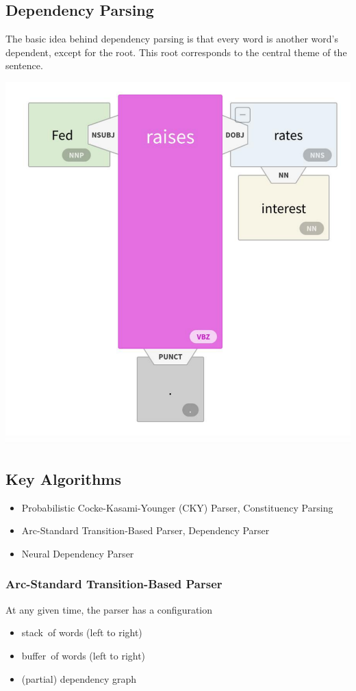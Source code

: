 \documentclass[11pt]{article}
\newcommand{\stack}{{\color{SlateGray4} stack}\ }
\newcommand{\buffer}{{\color{Orange1} buffer}\ }
\newcommand{\dependencygraph}{{\color{DodgerBlue3} dependency graph}\ }
\begin{document}
\subsection{Dependency Parsing}
\begin{minipage}{0.45\linewidth}
	The basic idea behind dependency parsing is that every word is another word’s dependent, except for the root. This root corresponds to the central theme of the sentence.
\end{minipage}
\hspace{\fill}
\begin{minipage}{0.45\linewidth}
	\centering
	\includegraphics[width=0.6\linewidth]{img/dependency_parsing}
\end{minipage}

\subsection{Key Algorithms}
\begin{itemize}
	\item Probabilistic Cocke-Kasami-Younger (CKY) Parser, Constituency Parsing
	\item Arc-Standard Transition-Based Parser, Dependency Parser
	\item Neural Dependency Parser
\end{itemize}

\subsubsection{Arc-Standard Transition-Based Parser}
At any given time, the parser has a configuration
\begin{itemize}[nosep]
	\item \stack of words (left to right)
	\item \buffer of words (left to right)
	\item (partial) \dependencygraph
\end{itemize}
\end{document}
